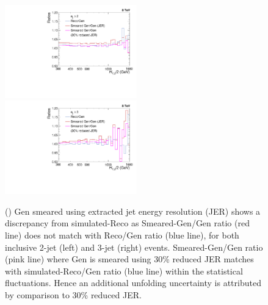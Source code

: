 \begin{figure}[!htbp]
 \begin{center}
 \hspace*{-5mm}\includegraphics[width=0.51\textwidth]{Plots_HT_2_150/Ratio_Reco_2_crystal.pdf}%
 ~~\includegraphics[width=0.51\textwidth]{Plots_HT_2_150/Ratio_Reco_3_crystal.pdf}
 \caption[Additional unfolding uncertainty.]{\MadGraphFn\plusn \PYTHIAS (\MGP) Gen smeared using extracted jet energy resolution (JER) shows a discrepancy from simulated-Reco as Smeared-Gen/Gen ratio (red line) does not match with Reco/Gen ratio (blue line), for both inclusive 2-jet (left) and 3-jet (right) events. Smeared-Gen/Gen ratio (pink line) where Gen is smeared using 30\% reduced JER matches with simulated-Reco/Gen ratio (blue line) within the statistical fluctuations. Hence an additional unfolding uncertainty is attributed by comparison to 30\% reduced JER.}
 \label{fig:ratios}
 \end{center}
\end{figure}


